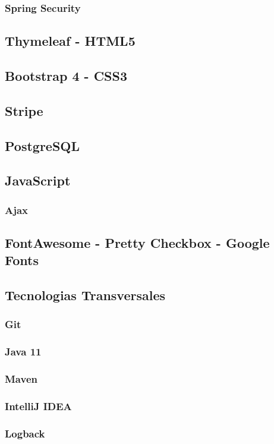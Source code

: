 \documentclass[a4paper]{report}
\begin{document}
    \subsubsection{Spring Security}
    \subsection{Thymeleaf - HTML5}
    \subsection{Bootstrap 4 - CSS3}
    \subsection{Stripe}
    \subsection{PostgreSQL}
    \subsection{JavaScript}
    \subsubsection{Ajax}
    \subsection{FontAwesome - Pretty Checkbox - Google Fonts}
    \subsection{Tecnologias Transversales}
    \subsubsection{Git}
    \subsubsection{Java 11}
    \subsubsection{Maven}
    \subsubsection{IntelliJ IDEA}
    \subsubsection{Logback}
\end{document}
